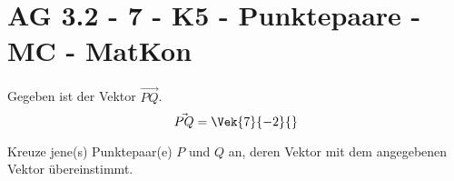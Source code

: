 \section{AG 3.2 - 7 - K5 - Punktepaare - MC - MatKon}

\begin{beispiel}[AG 3.2]{1}
Gegeben ist der Vektor $\vec{PQ}$.
$$\vec{PQ}=\Vek{7}{-2}{}$$

Kreuze jene(s) Punktepaar(e) $P$ und $Q$ an, deren Vektor mit dem angegebenen Vektor übereinstimmt.\vspace{0,2cm}

\end{beispiel}